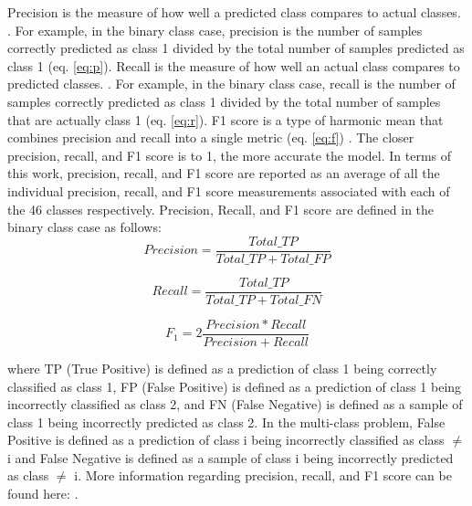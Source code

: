 \documentclass[trackchanges, floatfix, twocolumn, tighten]{aastex62}
\begin{document}
Precision is the measure of how well a predicted class compares to actual classes. \citep{Marsland}. For example, in the binary class case, precision is the number of samples correctly predicted as class 1 divided by the total number of samples predicted as class 1 (eq. \ref{eq:p}). Recall is the measure of how well an actual class compares to predicted classes. \citep{Marsland}. For example, in the binary class case, recall is the number of samples correctly predicted as class 1 divided by the total number of samples that are actually class 1 (eq. \ref{eq:r}). F1 score is a type of harmonic mean that combines precision and recall into a single metric (eq. \ref{eq:f}) \citep{Marsland}. The closer precision, recall, and F1 score is to 1, the more accurate the model. In terms of this work, precision, recall, and F1 score are reported as an average of all the individual precision, recall, and F1 score measurements associated with each of the 46 classes respectively. Precision, Recall, and F1 score are defined in the binary class case as follows:
\begin{equation}\label{eq:p}
	Precision = \frac{Total\_TP}{Total\_TP + Total\_FP}
\end{equation}

\begin{equation}\label{eq:r}
	Recall = \frac{Total\_TP}{Total\_TP + Total\_FN}
\end{equation}

\begin{equation}\label{eq:f}
	F_1 = 2 \frac{Precision * Recall}{Precision + Recall}
\end{equation}

\noindent where TP (True Positive) is defined as a prediction of class 1 being correctly classified as class 1, FP (False Positive) is defined as a prediction of class 1 being incorrectly classified as class 2, and FN (False Negative) is defined as a sample of class 1 being incorrectly predicted as class 2. In the multi-class problem, False Positive is defined as a prediction of class i being incorrectly classified as class $\neq$ i and False Negative is defined as a sample of class i being incorrectly predicted as class $\neq$ i. More information regarding precision, recall, and F1 score can be found here: \cite{Powers}. 
\end{document}
